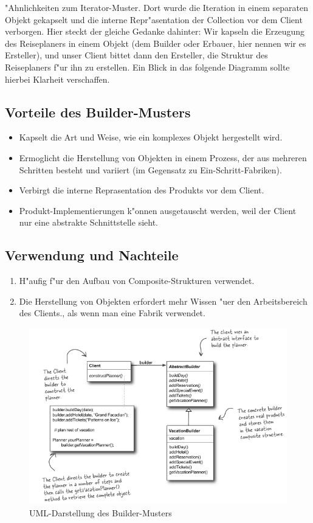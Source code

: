 "Ahnlichkeiten zum Iterator-Muster. Dort wurde die Iteration in einem separaten Objekt gekapselt und die interne Repr"asentation der Collection vor dem Client verborgen. Hier steckt der gleiche Gedanke dahinter: Wir kapseln die Erzeugung des Reiseplaners in einem Objekt (dem Builder oder Erbauer, hier nennen wir es Ersteller), und unser Client bittet dann den Ersteller, die Struktur des Reiseplaners f"ur ihn zu erstellen. Ein Blick in das folgende Diagramm sollte hierbei Klarheit verschaffen. 

\subsection{Vorteile des Builder-Musters}
\begin{itemize}
	\item Kapselt die Art und Weise, wie ein komplexes Objekt hergestellt wird.
	\item Ermoglicht die Herstellung von Objekten in einem Prozess, der aus mehreren Schritten besteht und variiert (im Gegensatz zu Ein-Schritt-Fabriken).
	\item Verbirgt die interne Reprasentation des Produkts vor dem Client. 
	\item Produkt-Implementierungen k"onnen ausgetauscht werden, weil der Client nur eine abstrakte Schnittstelle sieht. 
\end{itemize}

\subsection{Verwendung und Nachteile}
\begin{enumerate}
	\item H"aufig f"ur den Aufbau von Composite-Strukturen verwendet. 
	\item Die Herstellung von Objekten erfordert mehr Wissen "uer den Arbeitsbereich des Clients., als wenn man eine Fabrik verwendet.
\end{enumerate}

\begin{figure} [!htb]
	\centering
	\includegraphics[width=.9\linewidth]{builder/img/builderUML}
	\caption{UML-Darstellung des Builder-Musters}
	\label{fig:builder}
\end{figure}